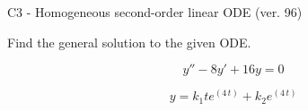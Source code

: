 \begin{exercise}
  \begin{exerciseTitle}C3 - Homogeneous second-order linear ODE (ver. 96)\end{exerciseTitle}
  \begin{exerciseStatement}
    
Find the general solution to the given ODE.

    
\[y''-8y'+16y = 0\]

  \end{exerciseStatement}
  \begin{exerciseAnswer}
    
\[y= k_{1} t e^{\left(4 \, t\right)} + k_{2} e^{\left(4 \, t\right)}\]

  \end{exerciseAnswer}
\end{exercise}